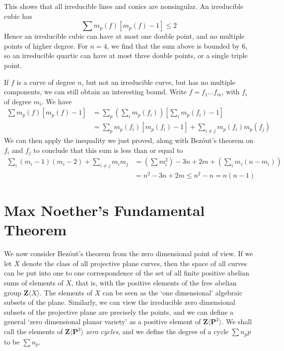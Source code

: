 This shows that all irreducible lines and conics are nonsingular. An irreducible cubic has
%
\[ \sum m_p(f)[m_p(f) - 1] \leq 2 \]
%
Hence an irreducible cubic can have at most one double point, and no multiple points of higher degree. For $n = 4$, we find that the sum above is bounded by $6$, so an irreducible quartic can have at most three double points, or a single triple point.

If $f$ is a curve of degree $n$, but not an irreducible curve, but has no multiple components, we can still obtain an interesting bound. Write $f = f_1 \dots f_m$, with $f_i$ of degree $m_i$. We have
%
\begin{align*}
    \sum m_p(f)[m_p(f) - 1] &= \sum_p \left( \sum_i m_p(f_i) \right) \left[\sum_i m_p(f_i) - 1 \right]\\
    &= \sum_p m_p(f_i)[m_p(f_i) - 1] + \sum_{i \neq j} m_p(f_i)m_p(f_j)
\end{align*}
%
We can then apply the inequality we just proved, along with Bez\'{o}ut's theorem on $f_i$ and $f_j$ to conclude that this sum is less than or equal to
%
\begin{align*}
    \sum_i (m_i - 1)(m_i - 2) + \sum_{i \neq j} m_im_j &= \left( \sum m_i^2 \right) - 3n + 2m + \left( \sum_i m_i(n-m_i) \right)\\
    &= n^2 - 3n + 2m \leq n^2 - n = n(n-1)
\end{align*}

\section{Max Noether's Fundamental Theorem}

We now consider Bez\'{o}ut's theorem from the zero dimensional point of view. If we let $X$ denote the class of all projective plane curves, then the space of all curves can be put into one to one correspondence of the set of all finite positive abelian sums of elements of $X$, that is, with the positive elements of the free abelian group $\mathbf{Z}\langle X \rangle$. The elements of $X$ can be seen as the `one dimensional' algebraic subsets of the plane. Similarly, we can view the irreducible zero dimensional subsets of the projective plane are precisely the points, and we can define a general `zero dimensional planar variety' as a positive element of $\mathbf{Z} \langle \mathbf{P}^2 \rangle$. We shall call the elements of $\mathbf{Z} \langle \mathbf{P}^2 \rangle$ \emph{zero cycles}, and we define the degree of a cycle $\sum n_p p$ to be $\sum n_p$.


